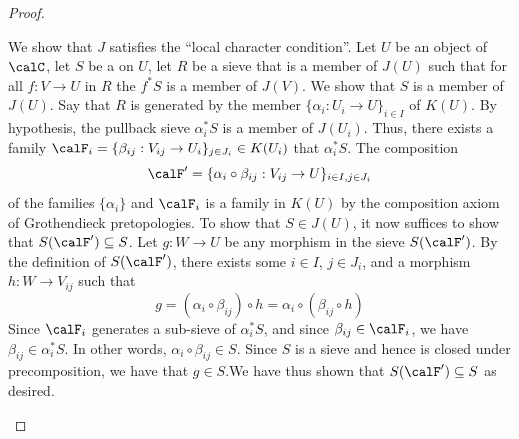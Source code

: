 \begin{proof}
\begin{enumerate}

        We show that $J$ satisfies the ``local character condition''. Let $U$ be an object of $\calC$, let $S$ be a  on $U$, let $R$ be a sieve that is a member of $J(U)$ such that for all $f: V \to U$ in $R$ the  $f^* S$ is a member of $J(V)$. We show that $S$ is a member of $J(U)$. Say that $R$ is generated by the member $\{\alpha_i: U_i \to U\}_{i \in I}$ of $K(U)$. By hypothesis, the pullback sieve $\alpha_i^* S$ is a member of $J(U_i)$. Thus, there exists a family $\calF_i = \{\beta_{ij} : V_{ij} \to U_i\}_{j \in J_i} \in K(U_i)$ that  $\alpha_i^* S$. The composition 
        $$\calF' = \{\alpha_i \circ \beta_{ij} : V_{ij} \to U\}_{i \in I, j \in J_i}$$
        of the families $\{\alpha_i\}$ and $\calF_i$ is a family in $K(U)$ by the composition axiom of Grothendieck pretopologies. To show that $S \in J(U)$, it now suffices to show that $S(\calF') \subseteq S$. Let $g: W \to U$ be any morphism in the sieve $S(\calF')$. By the definition of $S(\calF')$, there exists some $i \in I$, $j \in J_i$, and a morphism $h: W \to V_{ij}$ such that 
        $$g = (\alpha_i \circ \beta_{ij}) \circ h = \alpha_i \circ (\beta_{ij} \circ h)$$
        Since $\calF_i$ generates a sub-sieve of $\alpha_i^* S$, and since $\beta_{ij} \in \calF_i$, we have $\beta_{ij} \in \alpha_i^* S$. In other words, $\alpha_i \circ \beta_{ij} \in S$. Since $S$ is a sieve and hence is closed under precomposition, we have that $g \in S$.We have thus shown that $S(\calF') \subseteq S$ as desired. 


\end{enumerate}
\end{proof}

